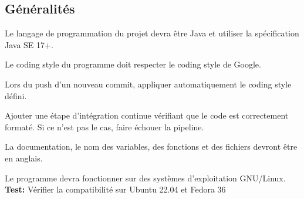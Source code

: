 \documentclass{article}
\begin{document}
\subsection{Généralités}

\begin{nonfunctionnalneedbox}
    Le langage de programmation du projet devra être Java et utiliser la spécification Java SE 17+.
\end{nonfunctionnalneedbox}

\begin{nonfunctionnalneedbox}
    Le coding style du programme doit respecter le coding style de Google.
    \begin{subneedbox}
        Lors du push d'un nouveau commit, appliquer automatiquement le coding style défini.
    \end{subneedbox}
    \begin{subneedbox}
        Ajouter une étape d'intégration continue vérifiant que le code est correctement formaté.
        Si ce n'est pas le cas, faire échouer la pipeline.
    \end{subneedbox}
\end{nonfunctionnalneedbox}

\begin{nonfunctionnalneedbox}
    La documentation, le nom des variables, des fonctions et des fichiers devront être en anglais.
\end{nonfunctionnalneedbox}

\begin{nonfunctionnalneedbox}
    Le programme devra fonctionner sur des systèmes d’exploitation GNU/Linux. \\
    \textbf{Test:} Vérifier la compatibilité sur Ubuntu 22.04 et Fedora 36
\end{nonfunctionnalneedbox}
\end{document}
